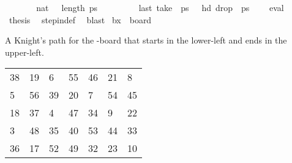 \begin{isabellebody}
\endisadelimproof
%
\isatagproof
{}\isamarkupfalse%
\ {\isacharminus}{\kern0pt}\isanewline
\ \ \isamarkupfalse%
\ {\isachardoublequoteopen}{}\ {\isacharless}{\kern0pt}\ {\isacharparenleft}{\kern0pt}{}{}{\isacharcolon}{\kern0pt}{\isacharcolon}{\kern0pt}nat{\isacharparenright}{\kern0pt}{\isachardoublequoteclose}\ {\isachardoublequoteopen}{}{}\ {\isacharless}{\kern0pt}\ length\ {\isacharquery}{\kern0pt}ps{\isachardoublequoteclose}\ \isanewline
\ \ \ \ \ \ \ \ {\isachardoublequoteopen}last\ {\isacharparenleft}{\kern0pt}take\ {}{}\ {\isacharquery}{\kern0pt}ps{\isacharparenright}{\kern0pt}\ {\isacharequal}{\kern0pt}\ {\isacharparenleft}{\kern0pt}{}{\isacharcomma}{\kern0pt}{}{\isacharparenright}{\kern0pt}{\isachardoublequoteclose}\ {\isachardoublequoteopen}hd\ {\isacharparenleft}{\kern0pt}drop\ {}{}\ {\isacharquery}{\kern0pt}ps{\isacharparenright}{\kern0pt}\ {\isacharequal}{\kern0pt}\ {\isacharparenleft}{\kern0pt}{}{\isacharcomma}{\kern0pt}{}{\isacharparenright}{\kern0pt}{\isachardoublequoteclose}\ \isamarkupfalse%
\ eval{\isacharplus}{\kern0pt}\isanewline
\ \ \isamarkupfalse%
\ \isamarkupfalse%
\ {\isacharquery}{\kern0pt}thesis\ \isamarkupfalse%
\ step{\isacharunderscore}{\kern0pt}in{\isacharunderscore}{\kern0pt}def\ \isamarkupfalse%
\ blast\isanewline
{}\isamarkupfalse%
%
\endisatagproof
{\isafoldproof}%
%
\isadelimproof
\isanewline
%
\endisadelimproof
\isanewline
{}\isamarkupfalse%
\ {\isachardoublequoteopen}b{}x{}\ {\isasymequiv}\ board\ {}\ {}{\isachardoublequoteclose}%
\begin{isamarkuptext}%
A Knight's path for the -board that starts in the lower-left and ends in the 
upper-left.
  \begin{table}[H]
    \begin{tabular}{lllllll}
      38 & 19 &  6 & 55 & 46 & 21 &  8 \\
       5 & 56 & 39 & 20 &  7 & 54 & 45 \\
      18 & 37 &  4 & 47 & 34 &  9 & 22 \\
       3 & 48 & 35 & 40 & 53 & 44 & 33 \\
      36 & 17 & 52 & 49 & 32 & 23 & 10 \\

\end{tabular}
\end{table}
\end{isamarkuptext}
\end{isabellebody}
